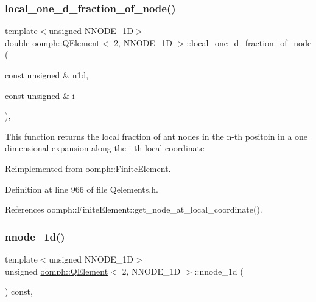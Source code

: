 \subsubsection{\texorpdfstring{local\+\_\+one\+\_\+d\+\_\+fraction\+\_\+of\+\_\+node()}{local\_one\_d\_fraction\_of\_node()}}
{\footnotesize\ttfamily template$<$unsigned N\+N\+O\+D\+E\+\_\+1D$>$ \\
double \hyperlink{classoomph_1_1QElement}{oomph\+::\+Q\+Element}$<$ 2, N\+N\+O\+D\+E\+\_\+1D $>$\+::local\+\_\+one\+\_\+d\+\_\+fraction\+\_\+of\+\_\+node (\begin{DoxyParamCaption}\item[{const unsigned \&}]{n1d,  }\item[{const unsigned \&}]{i }\end{DoxyParamCaption})\hspace{0.3cm}{\ttfamily [inline]}, {\ttfamily [virtual]}}

This function returns the local fraction of ant nodes in the n-\/th positoin in a one dimensional expansion along the i-\/th local coordinate 

Reimplemented from \hyperlink{classoomph_1_1FiniteElement_adb8ec7d2ceda37528c2d4542d572edf4}{oomph\+::\+Finite\+Element}.



Definition at line 966 of file Qelements.\+h.



References oomph\+::\+Finite\+Element\+::get\+\_\+node\+\_\+at\+\_\+local\+\_\+coordinate().

\mbox{\label{classoomph_1_1QElement_3_012_00_01NNODE__1D_01_4_a8654dd65f19c1b47a3361e55b92df34d}} 
\subsubsection{\texorpdfstring{nnode\+\_\+1d()}{nnode\_1d()}}
{\footnotesize\ttfamily template$<$unsigned N\+N\+O\+D\+E\+\_\+1D$>$ \\
unsigned \hyperlink{classoomph_1_1QElement}{oomph\+::\+Q\+Element}$<$ 2, N\+N\+O\+D\+E\+\_\+1D $>$\+::nnode\+\_\+1d (\begin{DoxyParamCaption}{ }\end{DoxyParamCaption}) const\hspace{0.3cm}{\ttfamily [inline]}, {\ttfamily [virtual]}}



